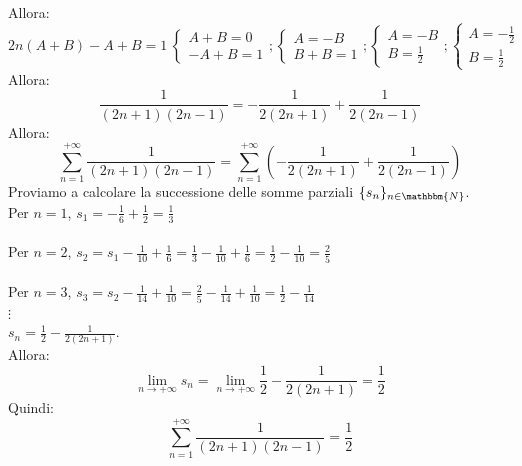 \documentclass[12pt]{report}
\begin{document}
 		Allora: \[2n(A+B) - A + B = 1\ \begin{cases}
 			A + B = 0 \\
 			-A + B = 1
 		\end{cases}; \begin{cases}
 		A = -B \\
 		B + B = 1
 		\end{cases} ; \begin{cases}
 		A = -B \\
 		B = \frac{1}{2}
 		\end{cases} ; \begin{cases}
 		A = -\frac{1}{2} \\
 		B = \frac{1}{2}
 		\end{cases}\]
 		Allora:
 		\[
 		\frac{1}{(2n+1)(2n-1)} = -\frac{1}{2(2n+1)} + \frac{1}{2(2n-1)}
 		\]
 		Allora:
 		\[
 		\sum_{n=1}^{+\infty}\frac{1}{(2n+1)(2n-1)}=\sum_{n=1}^{+\infty}(-\frac{1}{2(2n+1)} + \frac{1}{2(2n-1)})
 		\]
 		Proviamo a calcolare la successione delle somme parziali $\{s_n\}_{n\in\mathbbm{N}}$. \\
 		Per $n=1$, $s_1 = -\frac{1}{6} + \frac{1}{2} = \frac{1}{3}$ \\ \\
 		Per $n=2$, $s_2 = s_1 - \frac{1}{10} + \frac{1}{6} = \frac{1}{3}-\frac{1}{10}+\frac{1}{6}=\frac{1}{2} - \frac{1}{10} = \frac{2}{5}$ \\ \\
 		Per $n=3$, $s_3 = s_2 - \frac{1}{14} + \frac{1}{10} = \frac{2}{5} - \frac{1}{14} + \frac{1}{10} = \frac{1}{2}-\frac{1}{14}$ \\
 		$\vdots$ \\
 		$s_n = \frac{1}{2} - \frac{1}{2(2n+1)}$. \\
 		Allora:
 		\[
 		\lim_{n \to +\infty}s_n = \lim_{n \to +\infty}\frac{1}{2} - \frac{1}{2(2n+1)} = \frac{1}{2}
 		\]
 		Quindi:
 		\[
 		\sum_{n=1}^{+\infty}\frac{1}{(2n+1)(2n-1)} = \frac{1}{2}
 		\]
\end{document}
